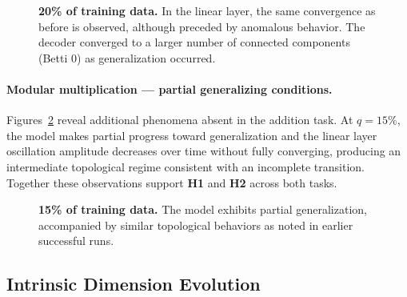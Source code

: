 \begin{figure}
	\centering
	
	
	\caption[20\% of training data (Modular Product).]{\textbf{20\% of training data.} In the linear layer, the same convergence as before is observed, although preceded by anomalous behavior. The decoder converged to a larger number of connected components (Betti 0) as generalization occurred.}
	\label{fig:prod-decoder0-linear-20pct}
\end{figure}

\paragraph{Modular multiplication — partial generalizing conditions.}
Figures~\ref{fig:prod-decoder0-linear-15pct}  reveal additional phenomena absent in the addition task. At $q = 15\%$, the model makes partial progress toward generalization and the linear layer oscillation amplitude decreases over time without fully converging, producing an intermediate topological regime consistent with an incomplete transition. Together these observations support \textbf{H1} and \textbf{H2} across both tasks.

\begin{figure}[htbp]
    \centering
    
    
    \caption[15\% of training data (Modular Product).]{\textbf{15\% of training data.} The model exhibits partial generalization, accompanied by similar topological behaviors as noted in earlier successful runs.}
    \label{fig:prod-decoder0-linear-15pct}
\end{figure}


\subsection{Intrinsic Dimension Evolution}
\label{subsec:results_id}

